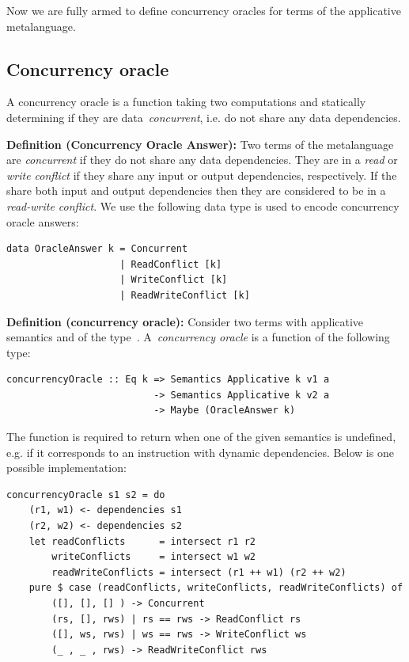 Now we are fully armed to define concurrency oracles for terms of the
applicative metalanguage.

\subsection{Concurrency oracle}
A concurrency oracle is a function taking two computations and statically
determining if they are data~\emph{concurrent}, i.e. do not share any
data dependencies.


\textbf{Definition (Concurrency Oracle Answer):\label{def:concurrency-status}}
Two terms of the metalanguage are \emph{concurrent} if they do not share any
data dependencies. They are in a \emph{read} or \emph{write conflict} if they
share any input or output dependencies, respectively. If the share both input
and output dependencies then they are considered to be in a \emph{read-write
conflict}. We use the following data type is used to encode concurrency oracle
answers:

\begin{verbatim}
data OracleAnswer k = Concurrent
                    | ReadConflict [k]
                    | WriteConflict [k]
                    | ReadWriteConflict [k]
\end{verbatim}

\textbf{Definition (concurrency oracle):\label{def:oracle}}
Consider two terms with applicative semantics  and  of the
type~. A~\emph{concurrency oracle} is a
function of the following type:
\begin{verbatim}
concurrencyOracle :: Eq k => Semantics Applicative k v1 a
                          -> Semantics Applicative k v2 a
                          -> Maybe (OracleAnswer k)
\end{verbatim}

\noindent
The function is required to return  when one of the given semantics
is undefined, e.g. if it corresponds to an instruction with dynamic dependencies.
Below is one possible implementation:

\begin{verbatim}
concurrencyOracle s1 s2 = do
    (r1, w1) <- dependencies s1
    (r2, w2) <- dependencies s2
    let readConflicts      = intersect r1 r2
        writeConflicts     = intersect w1 w2
        readWriteConflicts = intersect (r1 ++ w1) (r2 ++ w2)
    pure $ case (readConflicts, writeConflicts, readWriteConflicts) of
        ([], [], [] ) -> Concurrent
        (rs, [], rws) | rs == rws -> ReadConflict rs
        ([], ws, rws) | ws == rws -> WriteConflict ws
        (_ , _ , rws) -> ReadWriteConflict rws
\end{verbatim}

